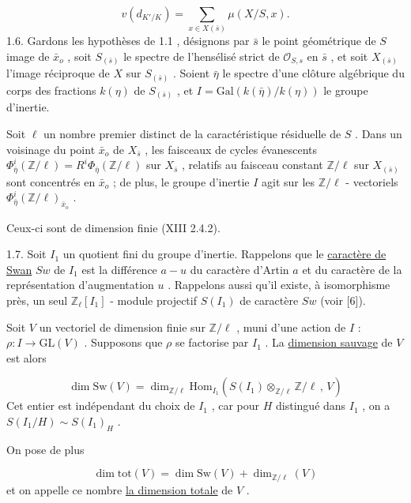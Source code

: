 \begin{equation}\tag{1.5.2}
v(d_{K'/K}) = \sum_{x \in X(\bar{s})} \mu(X/S,x).
\end{equation}
1.6. Gardons les hypothèses de 1.1 , désignons par $\bar{s}$ le point géométrique de $S$ image de $\bar{x}_o$ , soit $S_{(\bar{s})}$ le spectre de l'hensélisé strict de $\mathcal{O}_{S,s}$ en $\bar{s}$ , et soit $X_{(\bar{s})}$ l'image réciproque de $X$ sur $S_{(\bar{s})}$ . Soient $\bar{\eta}$ le spectre d'une clôture algébrique du corps des fractions $k(\eta)$ de $S_{(\bar{s})}$ , et $I = \mathrm{Gal}(k(\bar{\eta})/k(\eta))$ le groupe d'inertie.

Soit $\ell$ un nombre premier distinct de la caractéristique résiduelle de $S$ . Dans un voisinage du point $\bar{x}_o$ de $X_{\bar{s}}$ , les faisceaux de cycles évanescents $\Phi^i_{\bar{\eta}}(\mathbb{Z}/\ell) = R^i\Phi_{\bar{\eta}}(\mathbb{Z}/\ell)$ sur $X_{\bar{s}}$ , relatifs au faisceau constant $\mathbb{Z}/\ell$ sur $X_{(\bar{s})}$ sont concentrés en $\bar{x}_o$ ; de plus, le groupe d'inertie $I$ agit sur les $\mathbb{Z}/\ell$ - vectoriels $\Phi^i_{\bar{\eta}}(\mathbb{Z}/\ell)_{\bar{x}_o}$ .

Ceux-ci sont de dimension finie (XIII 2.4.2).

1.7. Soit $I_1$ un quotient fini du groupe d'inertie. Rappelons que le \underline{caractère de Swan} $Sw$ de $I_1$ est la différence $a - u$ du caractère d'Artin $a$ et du caractère de la représentation d'augmentation $u$ . Rappelons aussi qu'il existe, à isomorphisme près, un seul $\mathbb{Z}_\ell[I_1]$ - module projectif $S(I_1)$ de caractère $Sw$ (voir [6]).



Soit $V$ un vectoriel de dimension finie sur $\mathbb{Z}/\ell$ , muni d'une action de $I$ : $\rho : I \to \mathrm{GL}(V)$ . Supposons que $\rho$ se factorise par $I_1$ . La \underline{dimension sauvage} de $V$ est alors

\begin{equation}\tag{1.7.1}
\dim \mathrm{Sw}(V) = \dim_{\mathbb{Z}/\ell} \mathrm{Hom}_{I_1}(S(I_1) \otimes_{\mathbb{Z}/\ell} \mathbb{Z}/\ell \, , \, V)
\end{equation}
Cet entier est indépendant du choix de $I_1$ , car pour $H$ distingué dans $I_1$ , on a $S(I_1/H) \sim S(I_1)_H$ .

On pose de plus

\begin{equation*}
\dim \mathrm{tot}(V) = \dim \mathrm{Sw}(V) + \dim_{\mathbb{Z}/\ell}(V)
\end{equation*}
et on appelle ce nombre \underline{la dimension totale} de $V$ .


